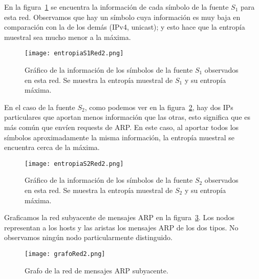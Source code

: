 En la figura~\ref{entropias1_2} se encuentra la información de cada símbolo de la fuente $S_1$ para esta red. Observamos que hay un símbolo cuya información es muy baja en comparación con la de los demás (IPv4, unicast); y esto hace que la entropía muestral sea mucho menor a la máxima.

\begin{figure}[H]
\centering
\texttt{[image: entropiaS1Red2.png]}
\caption{Gráfico de la información de los símbolos de la fuente $S_1$ observados en esta red. Se muestra la entropía muestral de $S_1$ y su entropía máxima.}
\label{entropias1_2}
\end{figure}

En el caso de la fuente $S_2$, como podemos ver en la figura~\ref{entropias2_2}, hay dos IPs particulares que aportan menos información que las otras, esto significa que es más común que envíen requests de ARP. En este caso, al aportar todos los símbolos aproximadamente la misma información, la entropía muestral se encuentra cerca de la máxima.

\begin{figure}[H]
\centering
\texttt{[image: entropiaS2Red2.png]}
\caption{Gráfico de la información de los símbolos de la fuente $S_2$ observados en esta red. Se muestra la entropía muestral de $S_2$ y su entropía máxima.}
\label{entropias2_2}
\end{figure}

Graficamos la red subyacente de mensajes ARP en la figura~\ref{grafo2}. Los nodos representan a los hosts y las aristas los mensajes ARP de los dos tipos. No observamos ningún nodo particularmente distinguido.

\begin{figure}[H]
\centering
\texttt{[image: grafoRed2.png]}
\caption{Grafo de la red de mensajes ARP subyacente.}
\label{grafo2}
\end{figure}
